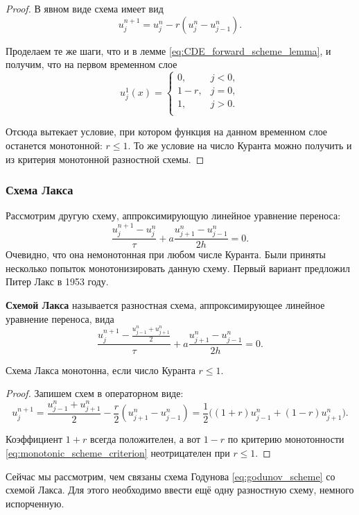 \documentclass{article}
\begin{document}
\begin{proof}
	В явном виде схема имеет вид
	\[u_j^{n+1}=u_j^n-r(u_j^n-u_{j-1}^n).\]

	Проделаем те же шаги, что и в лемме \eqref{eq:CDE_forward_scheme_lemma},
	и получим, что на первом временном слое
	\[u_j^1(x)=
		\begin{cases}
			0,   & j<0, \\
			1-r, & j=0, \\
			1,   & j>0. \\
		\end{cases}
	\]

	Отсюда вытекает условие, при котором функция на данном временном слое
	останется монотонной: $r\le 1$. То же условие на число Куранта можно
	получить и из критерия монотонной разностной схемы.
\end{proof}

\subsubsection{Схема Лакса}

Рассмотрим другую схему, аппроксимирующую линейное уравнение переноса:
\[\frac{u_j^{n+1}-u_j^n}{\tau}+a\frac{u_{j+1}^n-u_{j-1}^n}{2h}=0.\]
Очевидно, что она немонотонная при любом числе Куранта. Были приняты несколько
попыток монотонизировать данную схему. Первый вариант предложил Питер Лакс в
1953 году.

\begin{define}\label{eq:lax_scheme}
	\textbf{Схемой Лакса} называется разностная схема, аппроксимирующее
	линейное уравнение переноса, вида
	\[\frac{u_j^{n+1}-\frac{u_{j-1}^n+u_{j+1}^n}{2}}{\tau}+
	a\frac{u_{j+1}^n-u_{j-1}^n}{2h}=0.\]
\end{define}

\begin{lemma}
	Схема Лакса монотонна, если число Куранта $r\le 1$.
\end{lemma}

\begin{proof}
	Запишем схем в операторном виде:
	\[u_j^{n+1}=\frac{u_{j-1}^n+u_{j+1}^n}{2}-
	\frac{r}{2}(u_{j+1}^n-u_{j-1}^n)=
	\frac{1}{2}\big((1+r)u_{j-1}^n+(1-r)u_{j+1}^n\big).\]

	Коэффициент $1+r$ всегда положителен, а вот $1-r$ по критерию
	монотонности \eqref{eq:monotonic_scheme_criterion} неотрицателен при
	$r\le 1$.
\end{proof}

Сейчас мы рассмотрим, чем связаны схема Годунова \eqref{eq:godunov_scheme} со
схемой Лакса. Для этого необходимо ввести ещё одну разностную схему, немного
испорченную.
\end{document}
